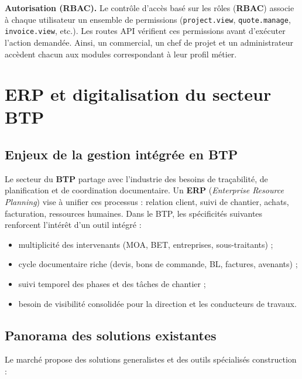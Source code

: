 \medskip

\textbf{Autorisation (RBAC).} Le contrôle d'accès basé sur les rôles (\textbf{RBAC})
associe à chaque utilisateur un ensemble de permissions (\texttt{project.view},
\texttt{quote.manage}, \texttt{invoice.view}, etc.). Les routes API vérifient ces
permissions avant d'exécuter l'action demandée. Ainsi, un commercial, un chef de
projet et un administrateur accèdent chacun aux modules correspondant à leur profil
métier.

\section{ERP et digitalisation du secteur BTP}

\subsection{Enjeux de la gestion intégrée en BTP}

Le secteur du \textbf{BTP} partage avec l'industrie des besoins de traçabilité, de
planification et de coordination documentaire. Un \textbf{ERP} (\textit{Enterprise
Resource Planning}) vise à unifier ces processus : relation client, suivi de chantier,
achats, facturation, ressources humaines. Dans le BTP, les spécificités suivantes
renforcent l'intérêt d'un outil intégré :

\begin{itemize}
  \item multiplicité des intervenants (MOA, BET, entreprises, sous-traitants) ;
  \item cycle documentaire riche (devis, bons de commande, BL, factures, avenants) ;
  \item suivi temporel des phases et des tâches de chantier ;
  \item besoin de visibilité consolidée pour la direction et les conducteurs de travaux.
\end{itemize}

\subsection{Panorama des solutions existantes}

Le marché propose des solutions generalistes et des outils spécialisés construction :


